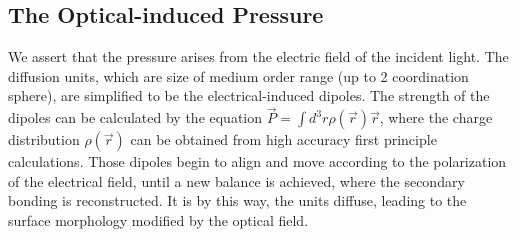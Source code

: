 \documentclass[aps, prl, twocolumn, groupedaddress]{revtex4-1}
\begin{document}

\subsection{The Optical-induced Pressure}
\label{sec:presquant}
We assert that the pressure arises from the electric field of the
incident light.  The diffusion units, which are size of medium order
range (up to 2 coordination sphere), are simplified to be the
electrical-induced dipoles. The strength of the dipoles can be
calculated by the equation $\vec{P} = \int d^3 r \rho(\vec{r})
\vec{r}$, where the charge distribution $\rho(\vec{r})$ can be
obtained from high accuracy first principle calculations. Those dipoles
begin to align and move according to the polarization of the electrical
field, until a new balance is achieved, where the secondary
bonding is reconstructed. It is by this way, the units diffuse, leading to
the surface morphology modified by the optical field.


\end{document}
